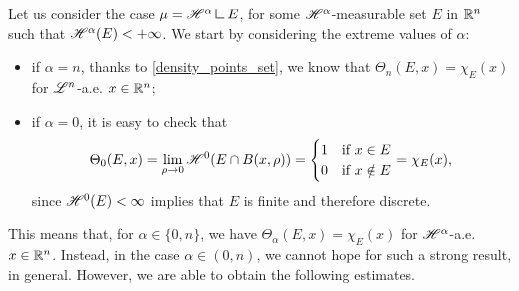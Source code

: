 Let us consider the case $\mu = \Haus{\alpha} \res E$, for some $\mathscr{H}^{\alpha}$-measurable set $E$ in $\mathbb{R}^{n}$ such that $\mathscr{H}^{\alpha}(E) < + \infty$. We start by considering the extreme values of $\alpha$:
\begin{itemize}
\item if $\alpha = n$, thanks to \eqref{density_points_set}, we know that $\Theta_{n}(E, x) = \chi_{E}(x)$ for $\mathscr{L}^{n}$-a.e. $x \in \mathbb{R}^{n}$; 
\item if $\alpha = 0$, it is easy to check that
\begin{equation*}
\Theta_{0}(E, x) = \lim_{\rho \to 0} \mathscr{H}^{0}(E \cap B(x, \rho)) = \begin{cases} 1 & \text{if} \ x \in E \\
0 & \text{if} \ x \notin E
\end{cases} = \chi_{E}(x),
\end{equation*} 
since $\mathscr{H}^{0}(E) < \infty$ implies that $E$ is finite and therefore discrete.
\end{itemize}
This means that, for $\alpha \in \{0, n\}$, we have $\Theta_{\alpha}(E, x) = \chi_{E}(x)$ for $\mathscr{H}^{\alpha}$-a.e. $x \in \mathbb{R}^{n}$.
Instead, in the case $\alpha \in (0, n)$, we cannot hope for such a strong result, in general. However, we are able to obtain the following estimates.

